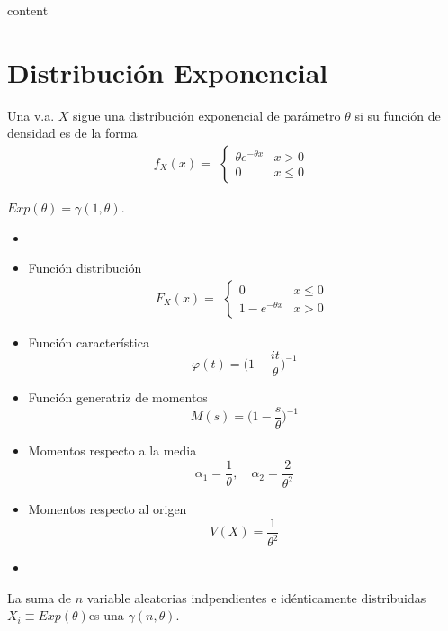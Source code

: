 \begin{dem}
  content
\end{dem}


\section{Distribución Exponencial}

\begin{defn}
  Una v.a. $X$ sigue una distribución exponencial de parámetro $\theta$ si su función de densidad es de la forma
  \[ 
    f_{X}(x) =
    \begin{aligned}
      \begin{cases}
        \theta e^{-\theta x} & x > 0 \\
        0 & x \leq 0
      \end{cases}
    \end{aligned} 
  \] 
\end{defn}

\begin{obs}
  $Exp (\theta) = \gamma(1, \theta)$.
\end{obs}

\begin{prop}
  \begin{itemize}
    \item []
    \item Función distribución
      \[ 
        F_{X}(x) =
        \begin{aligned}
          \begin{cases}
            0 & x \leq 0 \\
            1 - e^{-\theta x} & x > 0
          \end{cases}
        \end{aligned} 
      \] 
    \item Función característica
      \[ 
        \varphi(t) = \Big ( 1 - \frac{i t}{\theta} \Big )^{-1} 
      \] 
    \item Función generatriz de momentos
      \[ 
        M(s) = \Big ( 1 - \frac{s}{\theta} \Big ) ^{-1}
      \] 
    \item Momentos respecto a la media
      \[ 
        \alpha_{1} = \frac{1}{\theta}, \quad \alpha_{2} = \frac{2}{\theta^{2}}
      \] 
    \item Momentos respecto al origen
      \[ 
        V(X) = \frac{1}{\theta^{2}} 
      \] 
    \item 
  \end{itemize}
\end{prop}

\begin{theo}
  La suma de $n$ variable aleatorias indpendientes e idénticamente distribuidas $X_{i} \equiv Exp (\theta)$es una $\gamma(n, \theta)$.
\end{theo}
